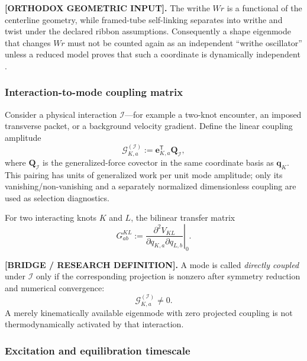 \textbf{[ORTHODOX GEOMETRIC INPUT].}
The writhe $Wr$ is a functional of the centerline geometry, while framed-tube
self-linking separates into writhe and twist under the declared ribbon
assumptions.  Consequently a shape eigenmode that changes $Wr$ must not be
counted again as an independent ``writhe oscillator'' unless a reduced model
proves that such a coordinate is dynamically independent
\cite{Moffatt1969,Calugareanu1961,White1969}.

\subsubsection{Interaction-to-mode coupling matrix}

Consider a physical interaction $\mathcal I$---for example a two-knot encounter,
an imposed transverse packet, or a background velocity gradient.  Define the
linear coupling amplitude
\begin{equation}
    \mathcal G^{(\mathcal I)}_{K,a}
    :=
    \mathbf e_{K,a}^{\mathsf T}
    \mathbf Q_{\mathcal I},
    \label{eq:rt_maxwell_mode_coupling_projection}
\end{equation}
where $\mathbf Q_{\mathcal I}$ is the generalized-force covector in the same
coordinate basis as $\mathbf q_K$.  This pairing has units of generalized work
per unit mode amplitude; only its vanishing/non-vanishing and a separately
normalized dimensionless coupling are used as selection diagnostics.

For two interacting knots $K$ and $L$, the bilinear transfer matrix
\begin{equation}
    G^{KL}_{ab}
    :=
    \left.
    \frac{\partial^2 V_{KL}}
    {\partial q_{K,a}\partial q_{L,b}}
    \right|_{0}.
    \label{eq:rt_maxwell_pair_coupling_matrix}
\end{equation}

\textbf{[BRIDGE / RESEARCH DEFINITION].}
A mode is called \emph{directly coupled} under $\mathcal I$ only if the
corresponding projection is nonzero after symmetry reduction and numerical
convergence:
\begin{equation}
    \mathcal G^{(\mathcal I)}_{K,a}\neq0 .
    \label{eq:rt_maxwell_direct_coupling_gate}
\end{equation}
A merely kinematically available eigenmode with zero projected coupling is not
thermodynamically activated by that interaction.

\subsubsection{Excitation and equilibration timescale}

